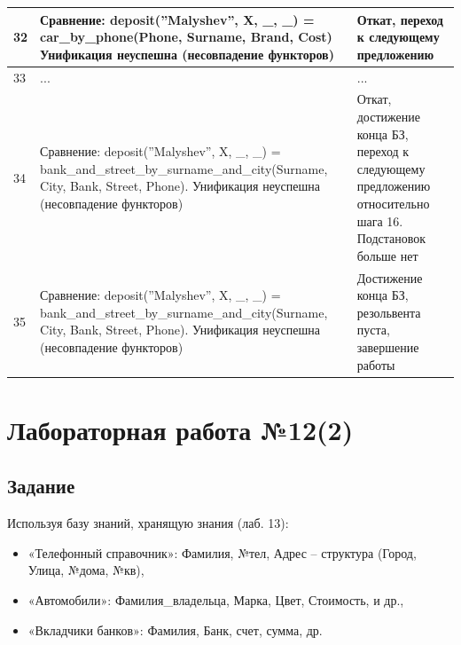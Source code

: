 \documentclass[12pt]{report}
\begin{document}
\begin{table}[H]
	\begin{center}
		\begin{tabular}{|p{1 cm}|p{11 cm}|p{7 cm}|}
			\hline
			32 & Сравнение: \newline deposit(''Malyshev'', X, \_, \_) = \newline car\_by\_phone(Phone, Surname, Brand, Cost) \newline Унификация неуспешна (несовпадение функторов) & Откат, переход к следующему предложению \\
			\hline
			33 & ... & ... \\
			\hline
			34 & Сравнение: \newline deposit(''Malyshev'', X, \_, \_) = \newline bank\_and\_street\_by\_surname\_and\_city(Surname, City, Bank, Street, Phone).  \newline Унификация неуспешна (несовпадение функторов) & Откат, достижение конца БЗ, переход к следующему предложению относительно шага 16. Подстановок больше нет \\
			\hline
			35 & Сравнение: \newline deposit(''Malyshev'', X, \_, \_) = \newline bank\_and\_street\_by\_surname\_and\_city(Surname, City, Bank, Street, Phone).  \newline Унификация неуспешна (несовпадение функторов) & Достижение конца БЗ, резольвента пуста, завершение работы \\
			\hline
		\end{tabular}
	\end{center}
\end{table} 

\chapter*{Лабораторная работа №12(2)}
\section*{Задание}
Используя  базу знаний, хранящую знания (лаб. 13):
\begin{itemize}
	\item «Телефонный справочник»: Фамилия, №тел, Адрес – структура (Город, Улица, №дома, №кв),
	\item «Автомобили»: Фамилия\_владельца, Марка, Цвет, Стоимость, и др.,
	\item «Вкладчики банков»: Фамилия, Банк, счет, сумма, др.
\end{itemize}
\end{document}

